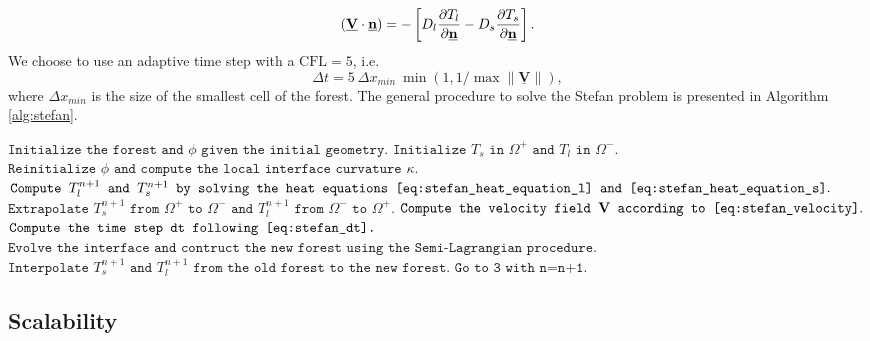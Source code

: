 \begin{equation} \label{eq:stefan_velocity}
(\underline{\mathbf{V}} \cdot \underline{\mathbf{n}}) = - \left[ D_l \frac{\partial T_l}{\partial \underline{\mathbf{n}}} - D_s \frac{\partial T_s}{\partial \underline{\mathbf{n}}} \right].
\end{equation}
We choose to use an adaptive time step with a $\text{CFL} = 5$, i.e.
\begin{equation} \label{eq:stefan_dt}
\Delta t = 5 ~ \Delta x_{min} ~ \min(1,1/\max \lVert \underline{\mathbf{V}} \rVert),
\end{equation}
where $\Delta x_{min}$ is the size of the smallest cell of the forest. The general procedure to solve the Stefan problem is presented in Algorithm \ref{alg:stefan}.

\begin{algorithm}[htbp]
\caption{$\texttt{General procedure for solving the Stefan problem}$}
\begin{algorithmic}[1]
\State $\texttt{Initialize the forest and }\phi\texttt{ given the initial geometry}.$
\State $\texttt{Initialize }T_s\texttt{ in }\Omega^+\texttt{ and }T_l\texttt{ in }\Omega^-.$
\State $\texttt{Reinitialize }\phi\texttt{ and compute the local interface curvature }\kappa.$
\State $\texttt{Compute }T^{n+1}_l\texttt{ and }T^{n+1}_s\texttt{ by solving the heat equations \eqref{eq:stefan_heat_equation_l} and \eqref{eq:stefan_heat_equation_s}}.$
\State $\texttt{Extrapolate }T^{n+1}_s\texttt{ from }\Omega^+\texttt{ to }\Omega^-\texttt{ and }T^{n+1}_l\texttt{ from }\Omega^-\texttt{ to }\Omega^+.$
\State $\texttt{Compute the velocity field }\mathbf{V}\texttt{ according to \eqref{eq:stefan_velocity}}.$
\State $\texttt{Compute the time step dt following \eqref{eq:stefan_dt}.}$
\State $\texttt{Evolve the interface and contruct the new forest using the Semi-Lagrangian procedure}.$
\State $\texttt{Interpolate }T^{n+1}_s\texttt{ and }T^{n+1}_l\texttt{ from the old forest to the new forest}.$
\State $\texttt{Go to 3 with n=n+1}.$
\end{algorithmic}
\label{alg:stefan}
\end{algorithm}

\subsection{Scalability}

